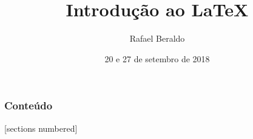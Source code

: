 \documentclass[final,notheorems]{beamer}
\title{Introdução ao \LaTeX}
\author{Rafael Beraldo \qquad \email{rberaldo@cabaladada.org}}
\date{20 e 27 de setembro de 2018}
\begin{document}
\maketitle

\begin{frame}
  \frametitle{Conteúdo}
  [sections numbered]
  \begin{columns}[t]
    \begin{column}{.5\textwidth}
      \tableofcontents[sections={1-10}]
    \end{column}
    \begin{column}{.5\textwidth}
      \tableofcontents[sections={11-19}]
    \end{column}
  \end{columns}
\end{frame}






















\end{document}
